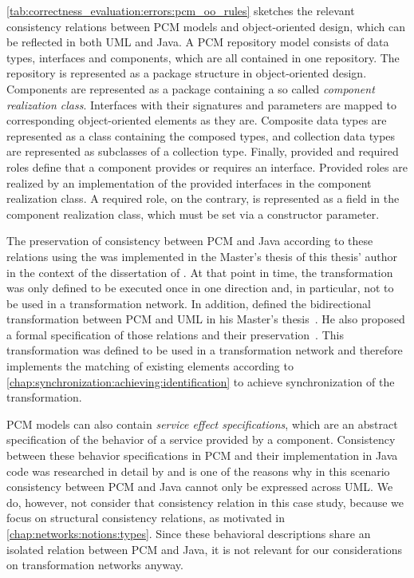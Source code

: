\autoref{tab:correctness_evaluation:errors:pcm_oo_rules} sketches the relevant consistency relations between \gls{PCM} models and object-oriented design, which can be reflected in both \gls{UML} and Java.
A \gls{PCM} repository model consists of data types, interfaces and components, which are all contained in one repository.
The repository is represented as a package structure in object-oriented design.
Components are represented as a package containing a so called \emph{component realization class}.
Interfaces with their signatures and parameters are mapped to corresponding object-oriented elements as they are.
Composite data types are represented as a class containing the composed types, and collection data types are represented as subclasses of a collection type.
Finally, provided and required roles define that a component provides or requires an interface.
Provided roles are realized by an implementation of the provided interfaces in the component realization class.
A required role, on the contrary, is represented as a field in the component realization class, which must be set via a constructor parameter.

The preservation of consistency between \gls{PCM} and Java according to these relations using the \reactionslanguage was implemented in the Master's thesis of this thesis' author~\cite{klare2016b} in the context of the dissertation of \textcite{langhammer2017a}.
At that point in time, the transformation was only defined to be executed once in one direction and, in particular, not to be used in a transformation network.
In addition, \citeauthor{syma2018ma} defined the bidirectional transformation between \gls{PCM} and \gls{UML} in his Master's thesis~\cite{syma2018ma}.
He also proposed a formal specification of those relations and their preservation~\cite[Section 5]{syma2018ma}.
This transformation was defined to be used in a transformation network and therefore implements the matching of existing elements according to \autoref{chap:synchronization:achieving:identification} to achieve synchronization of the transformation.

\gls{PCM} models can also contain \emph{service effect specifications}, which are an abstract specification of the behavior of a service provided by a component.
Consistency between these behavior specifications in \gls{PCM} and their implementation in Java code was researched in detail by \textcite{langhammer2017a} and is one of the reasons why in this scenario consistency between \gls{PCM} and Java cannot only be expressed across \gls{UML}.
We do, however, not consider that consistency relation in this case study, because we focus on structural consistency relations, as motivated in \autoref{chap:networks:notions:types}.
Since these behavioral descriptions share an isolated relation between \gls{PCM} and Java, it is not relevant for our considerations on transformation networks anyway.

